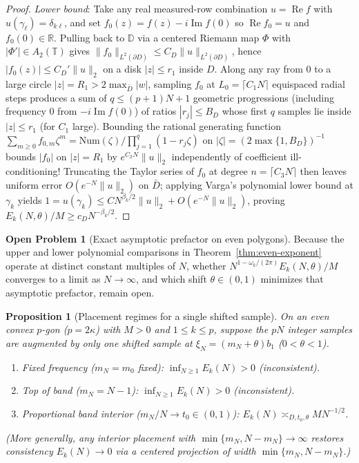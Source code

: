 \documentclass[11pt,reqno]{amsart}
\newtheorem{proposition}[theorem]{Proposition}
\theoremstyle{definition}
\newtheorem{openproblem}[theorem]{Open Problem}
\theoremstyle{remark}
\newcommand{\R}{\mathbb{R}}
\begin{document}
\begin{proof}
\emph{Lower bound}: Take any real measured-row combination $u = \operatorname{Re} f$ with $u(\gamma_\ell) = \delta_{k\ell}$, and set $f_0(z) = f(z) - i\operatorname{Im} f(0)$ so $\operatorname{Re} f_0 = u$ and $f_0(0) \in \R$. Pulling back to $\mathbb{D}$ via a centered Riemann map $\Phi$ with $|\Phi'| \in A_2(\mathbb{T})$ gives $\|f_0\|_{L^2(\partial D)} \le C_D \|u\|_{L^2(\partial D)}$, hence $|f_0(z)| \le C_D' \|u\|_2$ on a disk $|z| \le r_1$ inside $D$. Along any ray from $0$ to a large circle $|z| = R_1 > 2\max_{\bar D}|w|$, sampling $f_0$ at $L_0 = \lceil C_1 N \rceil$ equispaced radial steps produces a sum of $q \le (p+1)N + 1$ geometric progressions (including frequency $0$ from $-i\operatorname{Im}f(0)$) of ratios $|r_j| \le B_D$ whose first $q$ samples lie inside $|z| \le r_1$ (for $C_1$ large). Bounding the rational generating function $\sum_{m\ge 0} f_{0,m} \zeta^m = \text{Num}(\zeta)/\prod_{j=1}^q(1 - r_j\zeta)$ on $|\zeta| = (2\max\{1,B_D\})^{-1}$ bounds $|f_0|$ on $|z| = R_1$ by $e^{C_2 N}\|u\|_2$ independently of coefficient ill-conditioning! Truncating the Taylor series of $f_0$ at degree $n = \lceil C_3 N \rceil$ then leaves uniform error $O(e^{-N}\|u\|_2)$ on $\bar D$; applying Varga's polynomial lower bound at $\gamma_k$ yields $1 = u(\gamma_k) \le C N^{\beta_k/2}\|u\|_2 + O(e^{-N}\|u\|_2)$, proving $E_k(N,\theta)/M \ge c_D N^{-\beta_k/2}$.
\end{proof}

\begin{openproblem}[Exact asymptotic prefactor on even polygons]\label{op:even-prefactor}
Because the upper and lower polynomial comparisons in Theorem~\ref{thm:even-exponent} operate at distinct constant multiples of $N$, whether $N^{1 - \omega_k/(2\pi)} E_k(N,\theta)/M$ converges to a limit as $N \to \infty$, and which shift $\theta \in (0,1)$ minimizes that asymptotic prefactor, remain open.
\end{openproblem}

\begin{proposition}[Placement regimes for a single shifted sample]\label{prop:single-shift}
On an even convex $p$-gon ($p = 2\kappa$) with $M > 0$ and $1 \le k \le p$, suppose the $p N$ integer samples are augmented by \emph{only one} shifted sample at $\xi_N = (m_N + \theta) b_1$ ($0 < \theta < 1$).
\begin{enumerate}
  \item \emph{Fixed frequency ($m_N = m_0$ fixed)}: $\inf_{N \ge 1} E_k(N) > 0$ (inconsistent).
  \item \emph{Top of band ($m_N = N - 1$)}: $\inf_{N \ge 1} E_k(N) > 0$ (inconsistent).
  \item \emph{Proportional band interior ($m_N / N \to t_0 \in (0,1)$)}: $E_k(N) \asymp_{D,t_0,\theta} M N^{-1/2}$.
\end{enumerate}
(More generally, any interior placement with $\min\{m_N, N - m_N\} \to \infty$ restores consistency $E_k(N) \to 0$ via a centered projection of width $\min\{m_N, N - m_N\}$.)
\end{proposition}
\end{document}
